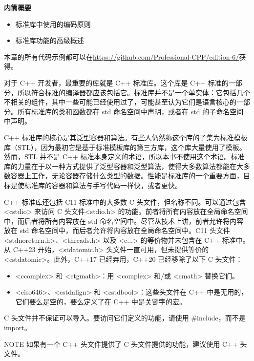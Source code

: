\noindent
\textbf{内筒概要}

\begin{itemize}
\item
标准库中使用的编码原则

\item
标准库功能的高级概述
\end{itemize}

本章的所有代码示例都可以在\url{https://github.com/Professional-CPP/edition-6/}获得。

对于 C++ 开发者，最重要的库就是 C++ 标准库。这个库是 C++ 标准的一部分，所以符合标准的编译器都应该包括它。标准库并不是一个单实体：它包括几个不相关的组件，其中一些可能已经使用过了，可能甚至认为它们是语言核心的一部分。所有标准库的类和函数都在 std 命名空间中声明，或者在 std 的子命名空间中声明。

C++ 标准库的核心是其泛型容器和算法。有些人仍然称这个库的子集为标准模板库（STL），因为最初它是基于标准模板库的第三方库，这个库大量使用了模板。然而，STL 并不是 C++ 标准本身定义的术语，所以本书不使用这个术语。标准库的力量在于以一种方式提供了泛型容器和泛型算法，使得大多数算法都能在大多数容器上工作，无论容器存储什么类型的数据。性能是标准库的一个重要方面，目标是使标准库的容器和算法与手写代码一样快，或者更快。

C++ 标准库还包括 C11 标准中的大多数 C 头文件，但名称不同。可以通过包含 <cstdio> 来访问 C 头文件<stdio.h> 的功能。前者将所有内容放在全局命名空间中，而后者将所有内容放在 std 命名空间中。尽管从技术上讲，前者允许将内容放在 std 命名空间中，而后者允许将内容放在全局命名空间中。C11 头文件 <stdnoreturn.h>、<threads.h> 以及 <c...> 的等价物并未包含在 C++ 标准中。从 C++23 开始，<stdatomic.h> 头文件一直可用，但未提供等价的 <cstdatomic>。此外，C++17 已经弃用，C++20 已经移除了以下 C 头文件：

\begin{itemize}
\item
<ccomplex> 和 <ctgmath>：用 <complex> 和/或 <cmath> 替换它们。

\item
<ciso646>、<cstdalign> 和 <cstdbool>：这些头文件在 C++ 中是无用的，它们要么是空的，要么定义了在 C++ 中是关键字的宏。
\end{itemize}

C 头文件并不保证可以导入。要访问它们定义的功能，请使用 \#include，而不是 import。

\begin{myNotic}{NOTE}
如果有一个 C++ 头文件提供了 C 头文件提供的功能，建议使用 C++ 头文件。
\end{myNotic}

